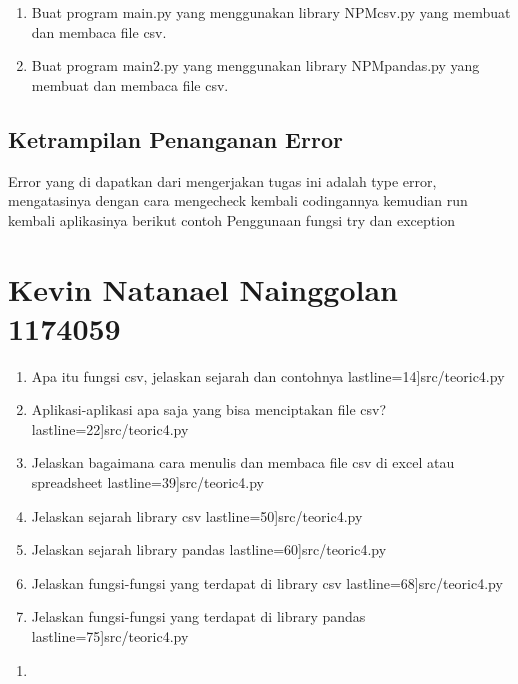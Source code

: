 \begin{enumerate}
			\item Buat program main.py yang menggunakan library NPMcsv.py yang membuat dan membaca file csv.			
			
			
			\item Buat program main2.py yang menggunakan library NPMpandas.py yang membuat dan membaca file csv.			
			
			
		\end{enumerate}
	
	\subsection{Ketrampilan Penanganan Error}
			Error yang di dapatkan dari mengerjakan tugas ini adalah type error, mengatasinya dengan cara mengecheck kembali codingannya
			kemudian run kembali aplikasinya
			berikut contoh Penggunaan fungsi try dan exception

			
\section {Kevin Natanael Nainggolan 1174059}
	\begin{enumerate}
		\item Apa itu fungsi csv, jelaskan sejarah dan contohnya 
			 lastline=14]{src/teoric4.py}
		\item Aplikasi-aplikasi apa saja yang bisa menciptakan file csv? 
			 lastline=22]{src/teoric4.py}
		\item Jelaskan bagaimana cara menulis dan membaca file csv di excel atau spreadsheet
			 lastline=39]{src/teoric4.py}
		\item Jelaskan sejarah library csv
			 lastline=50]{src/teoric4.py}
		\item Jelaskan sejarah library pandas
			 lastline=60]{src/teoric4.py}
		\item Jelaskan fungsi-fungsi yang terdapat di library csv
			 lastline=68]{src/teoric4.py}
		\item Jelaskan fungsi-fungsi yang terdapat di library pandas
			 lastline=75]{src/teoric4.py}
	\end {enumerate}	
	\begin{enumerate}
			\item	
	\end{enumerate}
			
